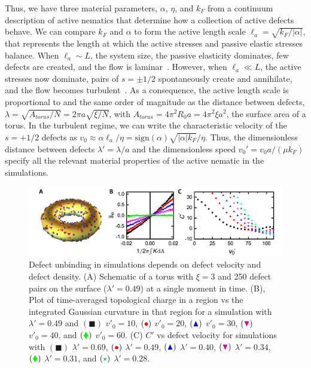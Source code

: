 Thus, we have three material parameters, $\alpha$, $\eta$, and $k_F$ from a continuum description of active nematics that determine how a collection of active defects behave.
We can compare $k_F$ and $\alpha$ to form the active length scale $\ell_a = \sqrt{k_F / |\alpha|}$, that represents the length at which the active stresses and passive elastic stresses balance.
When $\ell_a \sim L$, the system size, the passive elasticity dominates, few defects are created, and the flow is laminar~\cite{RN7}.
However, when $\ell_a \ll L$, the active stresses now dominate, pairs of $s = \pm 1/2$ spontaneously create and annihilate, and the flow becomes turbulent~\cite{RN7}.
As a consequence, the active length scale is proportional to and the same order of magnitude as the distance between defects, $\lambda = \sqrt{A_{torus}/N} = 2 \pi a \sqrt{\xi/N}$, with $A_{torus} = 4 \pi^2 R_0 a = 4 \pi^2 \xi a^2$, the surface area of a torus.
In the turbulent regime, we can write the characteristic velocity of the $s = +1/2$ defects as $v_0 \approx \alpha \ell_a/ \eta = \textrm{sign}(\alpha) \sqrt{|\alpha| k_F}/\eta$.
Thus, the dimensionless distance between defects $\lambda' = \lambda/a$ and the dimensionless speed $v_0' = v_0 a /(\mu k_F)$ specify all the relevant material properties of the active nematic in the simulations.
\begin{figure}
  \centering
  \includegraphics{figures/C3/Ch3-Figs_SimDefectUnbinding.png}
  \caption{Defect unbinding in simulations depends on defect velocity and defect density.
  (A) Schematic of a torus with $\xi = 3$ and 250 defect pairs on the surface ($\lambda' = 0.49$) at a single moment in time.
  (B), Plot of time-averaged topological charge in a region vs the integrated Gaussian curvature  in that region for a simulation with $\lambda' = 0.49$ and
  $({\blacksquare})$ $v'_0 = 10$,
  $({\color{red} \bullet})$ $v'_0 = 20$,
  $({\color{blue} \blacktriangle})$ $v'_0 = 30$,
  $({\color{magenta} \blacktriangledown})$ $v'_0 = 40$, and
  $({\color{green} \blacklozenge})$ $v'_0 = 60$.
  (C) $C'$ vs defect velocity for simulations with
  $({\blacksquare})$ $\lambda' = 0.69$,
  $({\color{red} \bullet})$ $\lambda' = 0.49$,
  $({\color{blue} \blacktriangle})$ $\lambda' = 0.40$,
  $({\color{magenta} \blacktriangledown})$ $\lambda' = 0.34$,
  $({\color{green} \blacklozenge})$ $\lambda' = 0.31$, and
  $({\color{teal} \star})$ $\lambda' = 0.28$.}\label{f:3-SimDefectUnbinding}
\end{figure}

